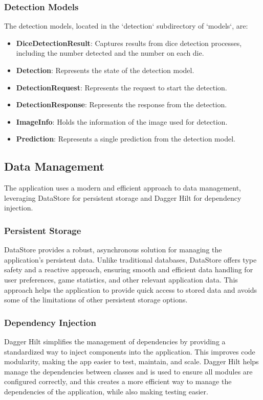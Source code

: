 \subsubsection{Detection Models}

The detection models, located in the `detection` subdirectory of `models`, are:

\begin{itemize}
    \item \textbf{DiceDetectionResult}: Captures results from dice detection processes, including the number detected and the number on each die.
    \item \textbf{Detection}: Represents the state of the detection model.
    \item \textbf{DetectionRequest}: Represents the request to start the detection.
    \item \textbf{DetectionResponse}: Represents the response from the detection.
    \item \textbf{ImageInfo}: Holds the information of the image used for detection.
    \item \textbf{Prediction}: Represents a single prediction from the detection model.
\end{itemize}

\subsection{Data Management}

The application uses a modern and efficient approach to data management, leveraging DataStore for persistent storage and Dagger Hilt for dependency injection.

\subsubsection{Persistent Storage}

DataStore provides a robust, asynchronous solution for managing the application's persistent data. Unlike traditional databases, DataStore offers type safety and a reactive approach, ensuring smooth and efficient data handling for user preferences, game statistics, and other relevant application data. This approach helps the application to provide quick access to stored data and avoids some of the limitations of other persistent storage options.

\subsubsection{Dependency Injection}
Dagger Hilt simplifies the management of dependencies by providing a standardized way to inject components into the application. This improves code modularity, making the app easier to test, maintain, and scale. Dagger Hilt helps manage the dependencies between classes and is used to ensure all modules are configured correctly, and this creates a more efficient way to manage the dependencies of the application, while also making testing easier.

